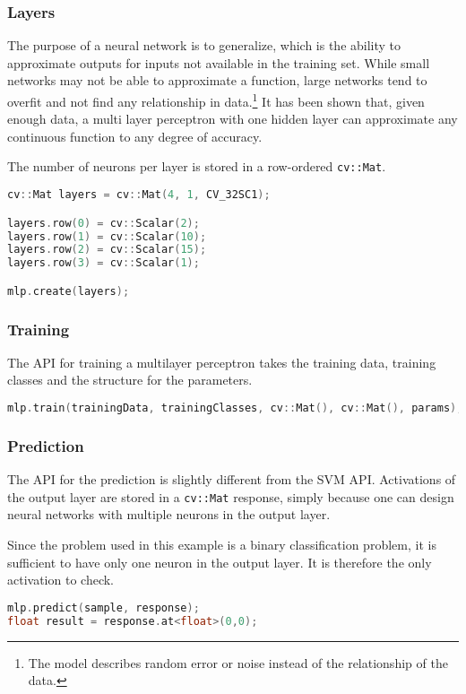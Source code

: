 \subsubsection*{Layers}
The purpose of a neural network is to generalize, which is the ability to approximate outputs for inputs not available in the training set. \cite{Sa02} While small networks may not be able to approximate a function, large networks tend to overfit and not find any relationship in data.\footnote{The model describes random error or noise instead of the relationship of the data.} It has been shown that, given enough data, a multi layer perceptron with one hidden layer can approximate any continuous function to any degree of accuracy. \cite{HSW92}

The number of neurons per layer is stored in a row-ordered \lstinline|cv::Mat|.

\begin{lstlisting}[language=C++]
cv::Mat layers = cv::Mat(4, 1, CV_32SC1);

layers.row(0) = cv::Scalar(2);
layers.row(1) = cv::Scalar(10);
layers.row(2) = cv::Scalar(15);
layers.row(3) = cv::Scalar(1);

mlp.create(layers);
\end{lstlisting}

\subsubsection*{Training}
The API for training a multilayer perceptron takes the training data, training classes and the structure for the parameters.

\begin{lstlisting}[language=C++]
mlp.train(trainingData, trainingClasses, cv::Mat(), cv::Mat(), params);
\end{lstlisting}

\subsubsection*{Prediction}
The API for the prediction is slightly different from the SVM API. Activations of the output layer are stored in a \lstinline|cv::Mat| response, simply because one can design neural networks with multiple neurons in the output layer.

Since the problem used in this example is a binary classification problem, it is sufficient to have only one neuron in the output layer. It is therefore the only activation to check.

\begin{lstlisting}[language=C++]
mlp.predict(sample, response);
float result = response.at<float>(0,0);
\end{lstlisting}
